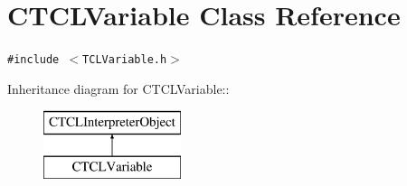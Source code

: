 \section{CTCLVariable  Class Reference}
\label{classCTCLVariable}
{\tt \#include $<$TCLVariable.h$>$}

Inheritance diagram for CTCLVariable::\begin{figure}[H]
\begin{center}
\leavevmode
\includegraphics[height=2cm]{classCTCLVariable}
\end{center}
\end{figure}
